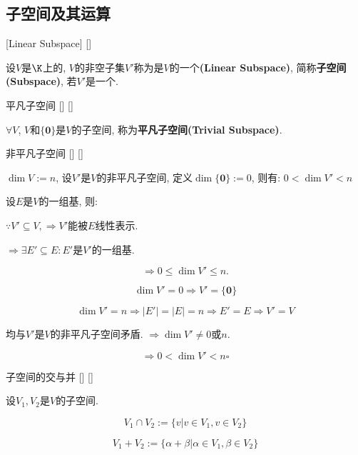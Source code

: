 \documentclass[UTF8]{ctexart}
\begin{document}
	\subsection{子空间及其运算}
		
		\begin{dfn}
			{}
			[Linear Subspace]
			[]

			设$V$是$\K$上的, $V$的非空子集$V'$称为是$V$的一个\textbf{(Linear Subspace)}, 简称\textbf{子空间(Subspace)}, 若$V'$是一个. 
		\end{dfn}
		
		\begin{ppt}
			[]
			{平凡子空间}
			[]
			[]

			$\forall$$V$, $V$和$\{\mathbf{0}\}$是$V$的子空间, 称为\textbf{平凡子空间(Trivial Subspace)}. 
		\end{ppt}
		
		\begin{ppt}
			[]
			{非平凡子空间}
			[]
			[]

			$\dim V:=n$, 设$V'$是$V$的非平凡子空间, 定义$\dim \{\mathbf{0}\}:=0$, 则有: $0<\dim V'<n$
		\end{ppt}
  
		\begin{prf}
		
			设$E$是$V$的一组基, 则: 
			
			$\because V'\subseteq V, \Longrightarrow V'$能被$E$线性表示. 
			
			$\Longrightarrow \exists E'\subseteq E: E'$是$V'$的一组基. 
			
			$$\Longrightarrow 0\leq \dim V' \leq n.$$
			
			$$\dim V'=0\Longrightarrow V'=\{\mathbf{0}\}$$
			
			$$\dim V'=n\Longrightarrow |E'|=|E|=n\Longrightarrow E'=E\Longrightarrow V'=V$$
			
			均与$V'$是$V$的非平凡子空间矛盾. $\Longrightarrow \dim V'\neq 0$或$n$. 
			
			$$\Longrightarrow 0<\dim V'<n\square$$
		\end{prf}
  
		\begin{dfn}
			[]
			{子空间的交与并}
			[]
			[]

			设$V_{1},V_{2}$是$V$的子空间. 
			
			$$V_{1}\cap V_{2}:=\{v|v\in V_{1},v\in V_{2}\}$$
			
			$$V_{1}+V_{2}:=\{\alpha+\beta|\alpha\in V_{1}, \beta\in V_{2}\}$$
		\end{dfn}
		
\end{document}
